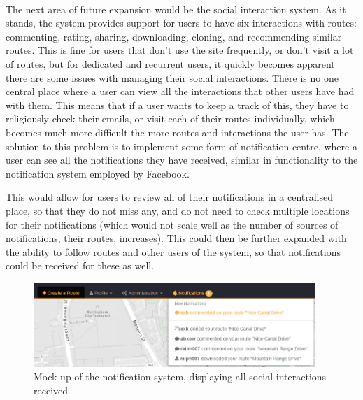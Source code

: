 \ \\
The next area of future expansion would be the social interaction system. As it stands, the system provides support for users to have six interactions with routes: commenting, rating, sharing, downloading, cloning, and recommending similar routes. This is fine for users that don't use the site frequently, or don't visit a lot of routes, but for dedicated and recurrent users, it quickly becomes apparent there are some issues with managing their social interactions. There is no one central place where a user can view all the interactions that other users have had with them. This means that if a user wants to keep a track of this, they have to religiously check their emails, or visit each of their routes individually, which becomes much more difficult the more routes and interactions the user has. The solution to this problem is to implement some form of notification centre, where a user can see all the notifications they have received, similar in functionality to the notification system employed by Facebook. 

\newpage 
\noindent 
This would allow for users to review all of their notifications in a centralised place, so that they do not miss any, and do not need to check multiple locations for their notifications (which would not scale well as the number of sources of notifications, their routes, increases). This could then be further expanded with the ability to follow routes and other users of the system, so that notifications could be received for these as well.

\begin{figure}[!ht]
	\begin{center}
		\includegraphics[width=0.95\textwidth]{images/further/notification.png}
	\end{center}
	\vspace{-6mm}
	\caption{Mock up of the notification system, displaying all social interactions received}	
\end{figure}

